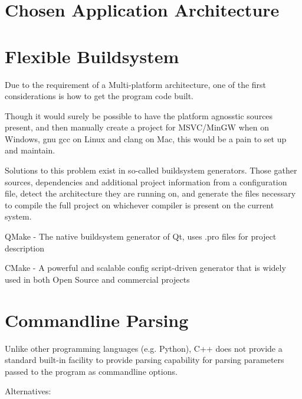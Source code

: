 \section{Chosen Application Architecture}




\section{Flexible Buildsystem}
Due to the requirement of a Multi-platform architecture, one of the first considerations is how to get the program code built.

Though it would surely be possible to have the platform agnosstic sources present, and then manually create a project for MSVC/MinGW when on Windows, gnu gcc on Linux and clang on Mac, this would be a pain to set up and maintain.

Solutions to this problem exist in so-called buildsystem generators. Those gather sources, dependencies and additional project information from a configuration file, detect the architecture they are running on, and generate the files necessary to compile the full project on whichever compiler is present on the current system.

QMake - The native buildsystem generator of Qt, uses .pro files for project description

CMake - A powerful and scalable config script-driven generator that is widely used in both Open Source and commercial projects 


\section{Commandline Parsing}
Unlike other programming languages (e.g. Python), C++ does not provide a standard built-in facility to provide parsing capability for parsing parameters passed to the program as commandline options.

Alternatives:


